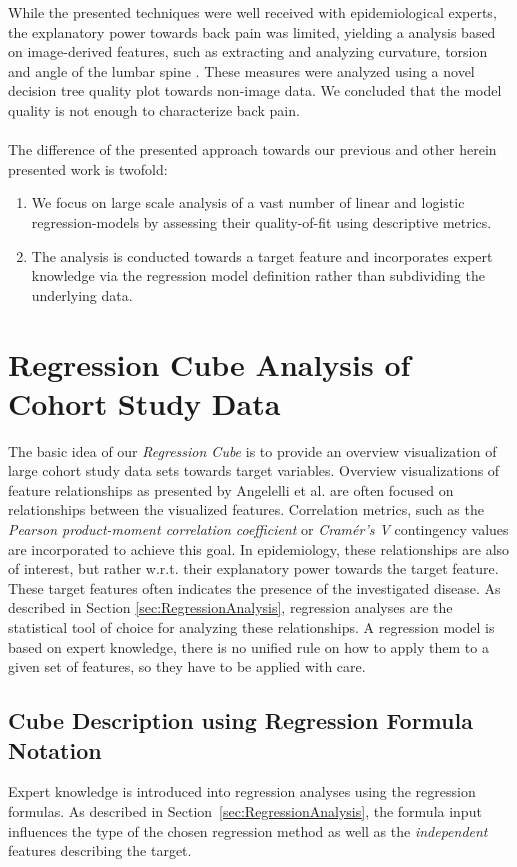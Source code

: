 \documentclass[journal]{style/vgtc} 			          %
\newcommand{\com}[1]{\textcolor{orange}{\uline{#1}}}
\begin{document}
While the presented techniques were well received with epidemiological experts, the explanatory power towards back pain was limited, yielding a analysis based on image-derived features, such as extracting and analyzing curvature, torsion and angle of the lumbar spine \cite{Klemm2015}.
These measures were analyzed using a novel decision tree quality plot towards non-image data.
We concluded that the model quality is not enough to characterize back pain.
\\\\
The difference of the presented approach towards our previous and other herein presented work is twofold:
\begin{enumerate}
	\item We focus on large scale analysis of a vast number of linear and logistic regression-models by assessing their quality-of-fit using descriptive metrics.
	\item The analysis is conducted towards a target feature and incorporates expert knowledge via the regression model definition rather than subdividing the underlying data.
\end{enumerate}
\section{Regression Cube Analysis of Cohort Study Data}
The basic idea of our \emph{Regression Cube} is to provide an overview visualization of large cohort study data sets towards target variables.
Overview visualizations of feature relationships as presented by Angelelli et al. \cite{Angelelli} are often focused on relationships between the visualized features.
Correlation metrics, such as the \emph{Pearson product-moment correlation coefficient} or \emph{Cram\'{e}r's V} contingency values are incorporated to achieve this goal.
In epidemiology, these relationships are also of interest, but rather w.r.t. their explanatory power towards the target feature.
These target features often indicates the presence of the investigated disease.
As described in Section \ref{sec:RegressionAnalysis}, regression analyses are the statistical tool of choice for analyzing these relationships.
A regression model is based on expert knowledge, there is no unified rule on how to apply them to a given set of features, so they have to be applied with care.
\subsection{Cube Description using Regression Formula Notation}
Expert knowledge is introduced into regression analyses using the regression formulas.
As described in Section~\ref{sec:RegressionAnalysis}, the formula input influences the type of the chosen regression method as well as the \emph{independent} features describing the target.
\end{document}
